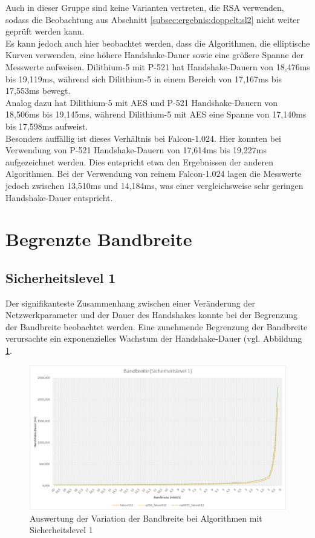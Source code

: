 		Auch in dieser Gruppe sind keine Varianten vertreten, die RSA verwenden, sodass die Beobachtung aus Abschnitt \ref{subsec:ergebnis:doppelt:sl2} nicht weiter geprüft werden kann.\\
		
		Es kann jedoch auch hier beobachtet werden, dass die Algorithmen, die elliptische Kurven verwenden, eine höhere Handshake-Dauer sowie eine größere Spanne der Messwerte aufweisen. Dilithium-5 mit P-521 hat Handshake-Dauern von 18,476ms bis 19,119ms, während sich Dilithium-5 in einem Bereich von 17,167ms bis 17,553ms bewegt.\\
		
		Analog dazu hat Dilithium-5 mit AES und P-521 Handshake-Dauern von 18,506ms bis 19,145ms, während Dilithium-5 mit AES eine Spanne von 17,140ms bis 17,598ms aufweist.\\
		
		Besonders auffällig ist dieses Verhältnis bei Falcon-1.024. Hier konnten bei Verwendung von P-521 Handshake-Dauern von 17,614ms bis 19,227ms aufgezeichnet werden. Dies entspricht etwa den Ergebnissen der anderen Algorithmen. Bei der Verwendung von reinem Falcon-1.024 lagen die Messwerte jedoch zwischen 13,510ms und 14,184ms, was einer vergleichsweise sehr geringen Handshake-Dauer entspricht.
		
	\section{Begrenzte Bandbreite}
	\label{sec:ergebnis:bandbreite}
	
		\subsection{Sicherheitslevel 1}
		\label{subsec:ergebnis:bandbreite:sl1}
		
		Der signifikanteste Zusammenhang zwischen einer Veränderung der Netzwerkparameter und der Dauer des Handshakes konnte bei der Begrenzung der Bandbreite beobachtet werden. Eine zunehmende Begrenzung der Bandbreite verursachte ein exponenzielles Wachstum der Handshake-Dauer (vgl. Abbildung \ref{fig:ergebnis:bandbreite:sl1}.
		
		\begin{figure}[htbp]
			\centering
			\includegraphics[width=\textwidth]{../auswertung/bandbreite_sl1.png}
			\caption{Auswertung der Variation der Bandbreite bei Algorithmen mit Sicherheitslevel 1}
			\label{fig:ergebnis:bandbreite:sl1}
		\end{figure}
		
